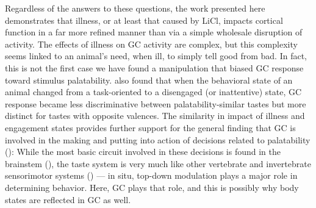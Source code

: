 \begin{refsection}
Regardless of the answers to these questions, the work presented here demonstrates that illness, or at least that caused by LiCl, impacts cortical function in a far more refined manner than via a simple wholesale disruption of activity. The effects of illness on GC activity are complex, but this complexity seems linked to an animal’s need, when ill, to simply tell good from bad. In fact, this is not the first case we have found a manipulation that biased GC response toward stimulus palatability. \cite{fontanini2006a} also found that when the behavioral state of an animal changed from a task-oriented to a disengaged (or inattentive) state, GC response became less discriminative between palatability-similar tastes but more distinct for tastes with opposite valences. The similarity in impact of illness and engagement states provides further support for the general finding that GC is involved in the making and putting into action of decisions related to palatability (\cite{sadacca2016a,mukherjee2019a}): While the most basic circuit involved in these decisions is found in the brainstem (\cite{grill1978a,grill1978b,geran2006a}), the taste system is very much like other vertebrate and invertebrate sensorimotor systems (\cite{geran2006a}) --- in situ, top-down modulation plays a major role in determining behavior. Here, GC plays that role, and this is possibly why body states are reflected in GC as well.

\begin{singlespace}
\printbibliography[title={References}]
\end{singlespace}

\end{refsection}